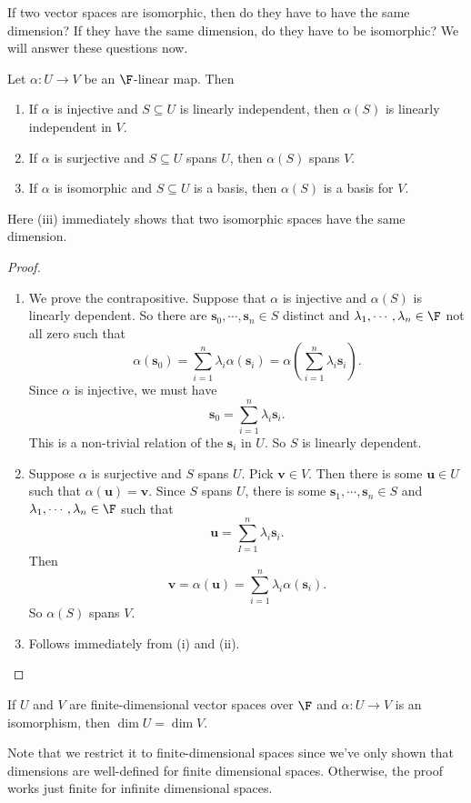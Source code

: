 \documentclass[a4paper]{article}
\begin{document}
If two vector spaces are isomorphic, then do they have to have the same dimension? If they have the same dimension, do they have to be isomorphic? We will answer these questions now.
\begin{prop}
  Let $\alpha: U\to V$ be an $\F$-linear map. Then
  \begin{enumerate}
    \item If $\alpha$ is injective and $S\subseteq U$ is linearly independent, then $\alpha (S)$ is linearly independent in $V$.
    \item If $\alpha$ is surjective and $S\subseteq U$ spans $U$, then $\alpha (S)$ spans $V$.
    \item If $\alpha$ is isomorphic and $S\subseteq U$ is a basis, then $\alpha(S)$ is a basis for $V$.
  \end{enumerate}
\end{prop}
Here (iii) immediately shows that two isomorphic spaces have the same dimension.
\begin{proof}\leavevmode
  \begin{enumerate}
    \item We prove the contrapositive. Suppose that $\alpha$ is injective and $\alpha(S)$ is linearly dependent. So there are $\mathbf{s}_0, \cdots, \mathbf{s}_n \in S$ distinct and $\lambda_1, \cdots, \lambda_n\in \F$ not all zero such that
      \[
        \alpha(\mathbf{s}_0) = \sum_{i = 1}^n \lambda_i \alpha(\mathbf{s}_i) = \alpha\left(\sum_{i = 1}^n \lambda_i \mathbf{s}_i\right).
      \]
      Since $\alpha$ is injective, we must have
      \[
        \mathbf{s}_0 = \sum_{i = 1}^n \lambda_i \mathbf{s}_i.
      \]
      This is a non-trivial relation of the $\mathbf{s}_i$ in $U$. So $S$ is linearly dependent.
    \item Suppose $\alpha$ is surjective and $S$ spans $U$. Pick $\mathbf{v} \in V$. Then there is some $\mathbf{u}\in U$ such that $\alpha(\mathbf{u}) = \mathbf{v}$. Since $S$ spans $U$, there is some $\mathbf{s}_1, \cdots, \mathbf{s}_n\in S$ and $\lambda_1, \cdots, \lambda_n\in \F$ such that
      \[
        \mathbf{u} = \sum_{I = 1}^n \lambda_i \mathbf{s}_i.
      \]
      Then
      \[
        \mathbf{v} = \alpha (\mathbf{u}) = \sum_{i = 1}^n \lambda_i \alpha (\mathbf{s}_i).
      \]
      So $\alpha (S)$ spans $V$.
    \item Follows immediately from (i) and (ii).
  \end{enumerate}
\end{proof}

\begin{cor}
  If $U$ and $V$ are finite-dimensional vector spaces over $\F$ and $\alpha: U\to V$ is an isomorphism, then $\dim U = \dim V$.
\end{cor}
Note that we restrict it to finite-dimensional spaces since we've only shown that dimensions are well-defined for finite dimensional spaces. Otherwise, the proof works just finite for infinite dimensional spaces.
\end{document}

